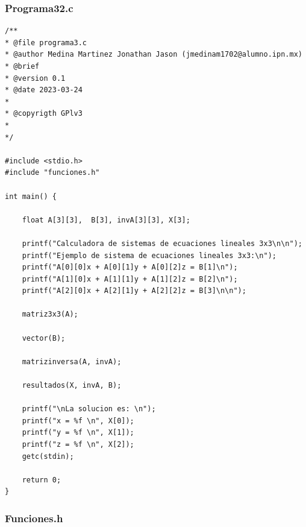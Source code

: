 \documentclass{article}
\begin{document}
	\newpage
	
	\subsubsection{Programa32.c}
	
	\begin{lstlisting}
/**
* @file programa3.c
* @author Medina Martinez Jonathan Jason (jmedinam1702@alumno.ipn.mx)
* @brief 
* @version 0.1
* @date 2023-03-24
* 
* @copyrigth GPlv3
* 
*/

#include <stdio.h>
#include "funciones.h"

int main() {

	float A[3][3],  B[3], invA[3][3], X[3];
	
	printf("Calculadora de sistemas de ecuaciones lineales 3x3\n\n");
	printf("Ejemplo de sistema de ecuaciones lineales 3x3:\n");
	printf("A[0][0]x + A[0][1]y + A[0][2]z = B[1]\n");
	printf("A[1][0]x + A[1][1]y + A[1][2]z = B[2]\n");
	printf("A[2][0]x + A[2][1]y + A[2][2]z = B[3]\n\n");
	
	matriz3x3(A);
	
	vector(B);
	
	matrizinversa(A, invA);
	
	resultados(X, invA, B);
	
	printf("\nLa solucion es: \n");
	printf("x = %f \n", X[0]);
	printf("y = %f \n", X[1]);
	printf("z = %f \n", X[2]);
	getc(stdin);
	
	return 0;
}
	\end{lstlisting}
	
	\subsubsection{Funciones.h}
	
\end{document}
